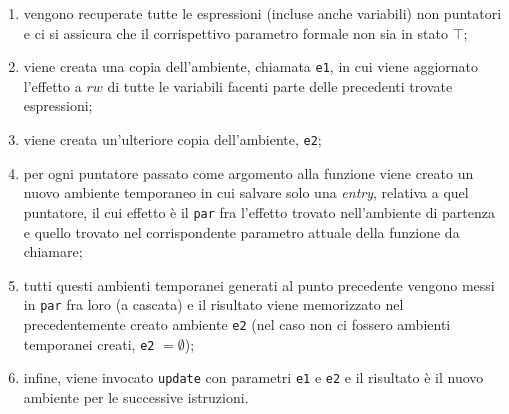 \documentclass[../report.tex]{subfiles}
\begin{document}
\begin{enumerate}
    \item vengono recuperate tutte le espressioni (incluse anche variabili) non puntatori e ci si assicura che il corrispettivo parametro formale non sia in stato $\top$;
    \item viene creata una copia dell'ambiente, chiamata \verb|e1|, in cui viene aggiornato l'effetto a $rw$ di tutte le variabili facenti parte delle precedenti trovate espressioni;
    \item viene creata un'ulteriore copia dell'ambiente, \verb|e2|;
    \item per ogni puntatore passato come argomento alla funzione viene creato un nuovo ambiente temporaneo in cui salvare solo una \textit{entry}, relativa a quel puntatore, il cui effetto è il \verb|par| fra l'effetto trovato nell'ambiente di partenza e quello trovato nel corrispondente parametro attuale della funzione da chiamare;
    \item tutti questi ambienti temporanei generati al punto precedente vengono messi in \verb|par| fra loro (a cascata) e il risultato viene memorizzato nel precedentemente creato ambiente \verb|e2| (nel caso non ci fossero ambienti temporanei creati, \verb|e2| $= \emptyset{}$);
    \item infine, viene invocato \verb|update| con parametri \verb|e1| e \verb|e2| e il risultato è il nuovo ambiente per le successive istruzioni.
\end{enumerate}
\end{document}
